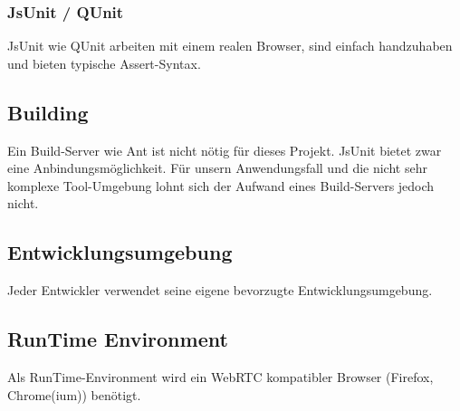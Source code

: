 \subsubsection{JsUnit / QUnit}
JsUnit wie QUnit arbeiten mit einem realen Browser, sind einfach handzuhaben und bieten typische Assert-Syntax.



\subsection{Building}
Ein Build-Server wie Ant ist nicht nötig für dieses Projekt. JsUnit bietet zwar
eine Anbindungsmöglichkeit. Für unsern Anwendungsfall und die nicht sehr
komplexe Tool-Umgebung lohnt sich der Aufwand eines Build-Servers jedoch nicht.


\subsection{Entwicklungsumgebung}
Jeder Entwickler verwendet seine eigene bevorzugte Entwicklungsumgebung.


\subsection{RunTime Environment}
Als RunTime-Environment wird ein WebRTC kompatibler Browser (Firefox,
Chrome(ium)) benötigt.


